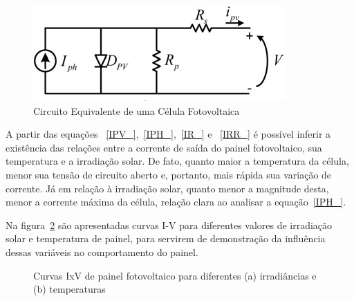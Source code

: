 \documentclass[
	12pt,				%
	openany,
	onseside,
	a4paper,			%
	english,			%
	french,				%
	spanish,			%
	brazil,				%
	]{abntex2}
\begin{document}
\begin{figure}[htbp]%
	\begin{center}
		\includegraphics[width=0.6\linewidth]{pv_model}
		\caption{Circuito Equivalente de uma Célula Fotovoltaica \cite{PV-Teory}}
		\label{fig:model_PV}
	\end{center}
\end{figure}

A partir das equações ~\ref{IPV_},~\ref{IPH_},~\ref{IR_} e ~\ref{IRR_} é possível inferir a existência das relações entre a corrente de saída do painel fotovoltaico, sua temperatura e a irradiação solar. De fato, quanto maior a temperatura da célula, menor sua tensão de circuito aberto e, portanto, mais rápida sua variação de corrente. Já em relação à irradiação solar, quanto menor a magnitude desta, menor a corrente máxima da célula, relação clara ao analisar a equação~\ref{IPH_}.

Na figura~\ref{fig:iv_pv_} são apresentadas curvas I-V para diferentes valores de irradiação solar e temperatura de painel, para servirem de demonstração da influência dessas variáveis no comportamento do painel.

\begin{figure}[htbp]%
	\captionsetup{justification=centering}
	\centering
	\qquad
	\caption{Curvas IxV de painel fotovoltaico para diferentes (a) irradiâncias e (b) temperaturas}%
	\label{fig:iv_pv_}%
\end{figure}
\end{document}

